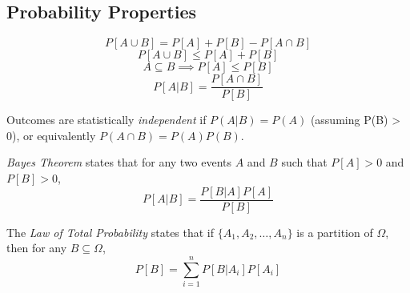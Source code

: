 \subsection{Probability Properties}
\begin{equation}
    P\left[A \cup B\right] = P\left[A\right] + P\left[B\right] - P\left[A \cap B\right]
\end{equation}
\begin{equation}
    P\left[A \cup B\right] \leq P\left[A\right] + P\left[B\right]
\end{equation}
\begin{equation}
    A \subseteq B \implies P\left[A\right] \leq P\left[B\right]
\end{equation}
\begin{equation}
    P\left[A | B\right] = \frac{P[A \cap B]}{P[B]}
\end{equation}

Outcomes are statistically \emph{independent} if
$P(A|B) = P(A)$ (assuming P(B) > 0), or
equivalently $P(A \cap B) = P(A)P(B)$.

\emph{Bayes Theorem} states that for any two events $A$ and $B$ such that $P[A] > 0$ and
$P[B] > 0$,
\begin{equation}
    P[A|B] = \frac{P[B|A]P[A]}{P[B]}
\end{equation}

The \emph{Law of Total Probability} states that if
$\{A_1, A_2, \dots, A_n\}$ is a partition of $\Omega$,
then for any $B \subseteq \Omega$,
\begin{equation}
    P[B] = \sum_{i = 1}^{n} P[B|A_i]P[A_i]
\end{equation}